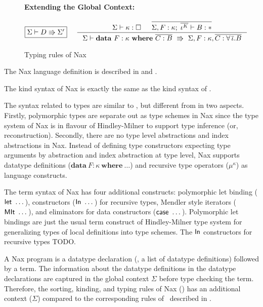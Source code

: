 \begin{figure}
\begin{framed}
\paragraph{Extending the Global Context:}
\[ \fbox{$\Sigma |- D \Rrightarrow \Sigma'$}
 ~~~~
   \inference[]{ \Sigma |- \kappa : \square
               & \overline{\Sigma,F:\kappa;\;\overline{\iota^K} |- B:*} }
               { \Sigma |- \mathbf{data}~ F : \kappa ~ \mathbf{where} ~
                                        \overline{C : B}
                        ~\Rrightarrow~
                           \Sigma,F:\kappa
                                 ,\overline{C:\forall\,\overline{\iota}.B} }
\]
\end{framed}
\caption{Typing rules of Nax}
\label{fig:NaxTyping}
\end{figure}

The Nax language definition is described in  and .

The kind syntax of Nax is exactly the same as the kind syntax of \Fi.

The syntax related to types are similar to \Fi, but different from \Fi
in two aspects.
Firstly, polymorphic types are separate out as type schemes in Nax
since the type system of Nax is in flavour of Hindley-Milner
to support type inference (or, reconstruction).
Secondly, there are no type level abstractions and index abstractions in Nax.
Instead of defining type constructors expecting type arguments by
abstraction and index abstraction at type level, Nax supports datatype
definitions ($\mathbf{data}~F:\kappa~\mathbf{where}~\dots$) and
recursive type operators ($\mu^\kappa$) as language constructs.

The term syntax of Nax has four additional constructs:
polymorphic let binding ($\mathsf{let}~\dots$),
constructors ($\mathsf{In}~\dots$) for recursive types,
Mendler style iterators ($\mathsf{MIt}~\dots$), and
eliminators for data constructors ($\mathsf{case}~\dots$).
Polymorphic let bindings are just the usual term construct of Hindley-Milner
type system for generalizing types of local definitions into type schemes.
The $\mathsf{In}$ constructors for recursive types TODO.


A Nax program is a datatype declaration (\ie, a list of datatype definitions)
followed by a term. The information about the datatype definitions in
the datatype declarations are captured in the global context $\Sigma$ before
type checking the term. Therefore, the sorting, kinding, and typing rules
of Nax () has an additional context ($\Sigma$) compared to
the corresponding rules of \Fi\ described in .

